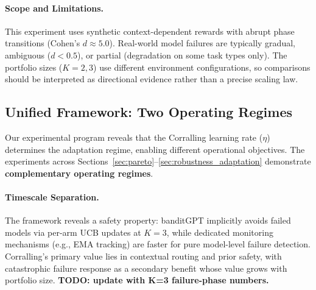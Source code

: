 \paragraph{Scope and Limitations.}
This experiment uses synthetic context-dependent rewards with abrupt phase transitions (Cohen's $d \approx 5.0$). Real-world model failures are typically gradual, ambiguous ($d < 0.5$), or partial (degradation on some task types only). The portfolio sizes ($K{=}2, 3$) use different environment configurations, so comparisons should be interpreted as directional evidence rather than a precise scaling law.



\subsection{Unified Framework: Two Operating Regimes}
\label{sec:three_regimes}

Our experimental program reveals that the Corralling learning rate ($\eta$) determines the adaptation regime, enabling different operational objectives. The experiments across Sections~\ref{sec:pareto}--\ref{sec:robustness_adaptation} demonstrate \textbf{complementary operating regimes}.

\begin{table}[htbp]
\centering
\caption{\textbf{Two Operating Regimes for Corralling-Based Routing}}
\label{tab:three_regimes}
\small
{}
\end{table}

\paragraph{Timescale Separation.}
The framework reveals a safety property: banditGPT implicitly avoids failed models via per-arm UCB updates at $K{=}3$, while dedicated monitoring mechanisms (e.g., EMA tracking) are faster for pure model-level failure detection. Corralling's primary value lies in contextual routing and prior safety, with catastrophic failure response as a secondary benefit whose value grows with portfolio size. \textbf{TODO: update with K=3 failure-phase numbers.}

